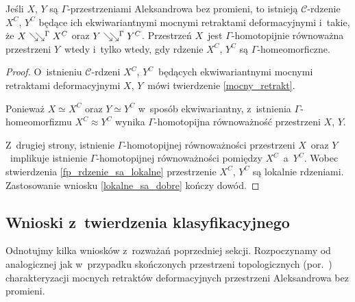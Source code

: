 \begin{tw}\label{wniosek_klasyfikacyjny}
Jeśli $X$, $Y$ są $\Gamma$-przestrzeniami Aleksandrowa bez promieni, to istnieją $\mathcal{C}$-rdzenie $X^C$, $Y^C$ będące ich ekwiwariantnymi mocnymi retraktami deformacyjnymi i~takie, że $X\searrow\!\!\searrow^\Gamma X^C$ oraz $Y\searrow\!\!\searrow^\Gamma Y^C$. Przestrzeń $X$~jest $\Gamma$-homotopijnie równoważna przestrzeni $Y$~wtedy i~tylko wtedy, gdy rdzenie $X^C$, $Y^C$ są $\Gamma$-homeomorficzne. 
\end{tw}
\begin{proof}
O~istnieniu $\mathcal{C}$-rdzeni $X^C$, $Y^C$~będących ekwiwariantnymi mocnymi retraktami deformacyjnymi $X$, $Y$~mówi twierdzenie \ref{mocny_retrakt}.

Ponieważ $X\simeq X^C$ oraz $Y\simeq Y^C$ w~sposób ekwiwariantny, z~istnienia \mbox{$\Gamma$-homeomorfizmu} $X^C\approx Y^C$ wynika $\Gamma$-homotopijna równoważność przestrzeni $X$, $Y$. 

Z~drugiej strony, istnienie $\Gamma$-homotopijnej równoważności przestrzeni $X$~oraz $Y$~implikuje istnienie $\Gamma$-homotopijnej równoważności pomiędzy $X^C$~a~$Y^C$. Wobec stwierdzenia \ref{fp_rdzenie_sa_lokalne} przestrzenie $X^C$, $Y^C$ są lokalnie rdzeniami. Zastosowanie wniosku \ref{lokalne_sa_dobre} kończy dowód.
\end{proof}



\subsection{Wnioski z~twierdzenia klasyfikacyjnego}
Odnotujmy kilka wniosków z~rozważań poprzedniej sekcji. Rozpoczynamy od analogicznej jak w~przypadku skończonych przestrzeni topologicznych (por.~\cite[Corollary 4.9]{Barmak12}) charakteryzacji mocnych retraktów deformacyjnych przestrzeni Aleksandrowa bez promieni.

